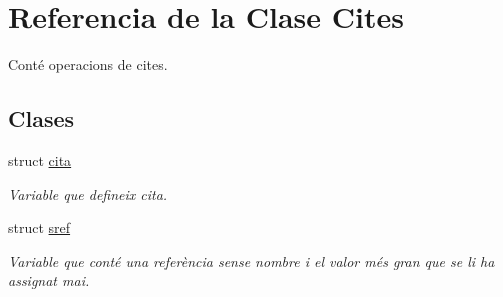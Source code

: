 \hypertarget{class_cites}{}\section{Referencia de la Clase Cites}
\label{class_cites}


Conté operacions de cites.  


\subsection*{Clases}
\begin{DoxyCompactItemize}
\item 
struct \hyperlink{struct_cites_1_1cita}{cita}
\begin{DoxyCompactList}\small\item\em Variable que defineix cita. \end{DoxyCompactList}\item 
struct \hyperlink{struct_cites_1_1sref}{sref}
\begin{DoxyCompactList}\small\item\em Variable que conté una referència sense nombre i el valor més gran que se li ha assignat mai. \end{DoxyCompactList}\end{DoxyCompactItemize}

